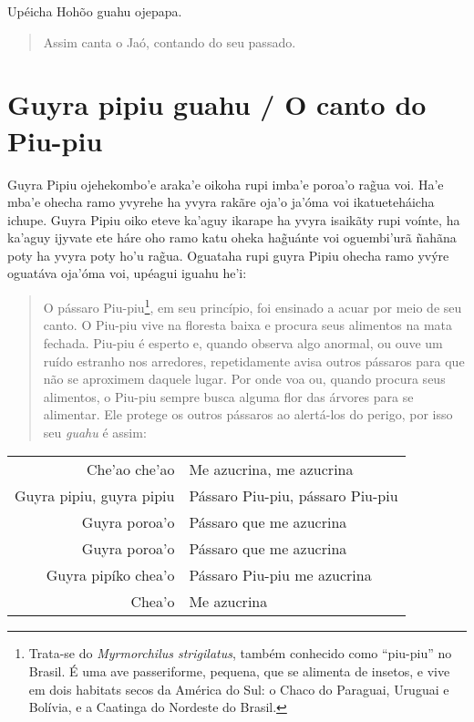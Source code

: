 \begin{itemize}




Upéicha Hohõo guahu ojepapa.

\begin{quote}
Assim canta o Jaó, contando do seu passado.
\end{quote}

\chapter{Guyra pipiu guahu / O canto do Piu-piu}

Guyra Pipiu ojehekombo'e araka'e oikoha rupi imba'e poroa'o rag̃ua voi.
Ha'e mba'e ohecha ramo yvyrehe ha yvyra rakãre oja'o ja'óma voi
ikatueteháicha ichupe. Guyra Pipiu oiko eteve ka'aguy ikarape ha yvyra
isaikãty rupi voínte, ha ka'aguy ijyvate ete háre oho ramo katu oheka
hag̃uánte voi oguembi'urã ñahãna poty ha yvyra poty ho'u rag̃ua. Oguataha
rupi guyra Pipiu ohecha ramo yvýre oguatáva oja'óma voi, upéagui iguahu
he'i:

\begin{quote}
O pássaro Piu-piu\footnote{Trata-se do \emph{Myrmorchilus strigilatus},
  também conhecido como ``piu-piu'' no Brasil. É uma ave passeriforme,
  pequena, que se alimenta de insetos, e vive em dois habitats secos da
  América do Sul: o Chaco do Paraguai, Uruguai e Bolívia, e a Caatinga
  do Nordeste do Brasil.}, em seu princípio, foi ensinado a acuar por
meio de seu canto. O Piu-piu vive na floresta baixa e procura seus
alimentos na mata fechada. Piu-piu é esperto e, quando observa algo
anormal, ou ouve um ruído estranho nos arredores, repetidamente avisa
outros pássaros para que não se aproximem daquele lugar. Por onde voa
ou, quando procura seus alimentos, o Piu-piu sempre busca alguma flor
das árvores para se alimentar. Ele protege os outros pássaros ao
alertá-los do perigo, por isso seu \emph{guahu} é assim:
\end{quote}


\begin{table}[]
\begin{tabular}{rl}
Che'ao che'ao          & Me azucrina, me azucrina           \\
Guyra pipiu, guyra pipiu          & Pássaro Piu-piu, pássaro Piu-piu           \\
Guyra poroa'o  		& Pássaro que me azucrina \\
Guyra poroa'o          & Pássaro que me azucrina           \\
Guyra pipíko chea'o          & Pássaro Piu-piu me azucrina           \\
Chea'o          & Me azucrina           \\
\end{tabular}
\end{table}


\end{itemize}
